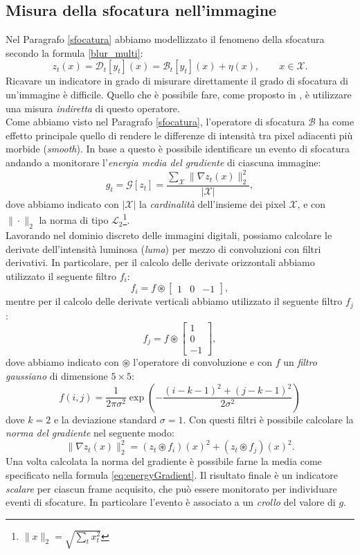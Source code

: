 \subsection{Misura della sfocatura nell'immagine}
Nel Paragrafo \ref{sfocatura} abbiamo modellizzato il fenomeno della sfocatura secondo la formula \eqref{blur_multi}:
\[z_t(x)=\mathcal{D}_t[y_t](x) = \mathcal{B}_t[y_t](x) + \eta(x), \qquad x \in \mathcal{X}.\]
Ricavare un indicatore in grado di misurare direttamente il grado di sfocatura di un'immagine \`e difficile.
Quello che \`e possibile fare, come proposto in \cite{alippi2010detecting}, \`e utilizzare una misura \textit{indiretta} di questo operatore.\\
Come abbiamo visto nel Paragrafo \ref{sfocatura}, l'operatore di sfocatura $\mathcal{B}$ ha come effetto principale quello di rendere le differenze di intensit\`a tra pixel adiacenti pi\`u morbide (\textit{smooth}).
In base a questo \`e possibile identificare un evento di sfocatura andando a monitorare l'\textit{energia media del gradiente} di ciascuna immagine:
\begin{equation}
\label{eq:energyGradient}
g_t = \mathcal{G}[z_t] =\frac{\sum_{\mathcal{X}}\| \nabla z_t(x) \| _2^2 }{|\mathcal{X}|} ,
\end{equation}  
dove abbiamo indicato con $|\mathcal{X}|$ la \textit{cardinalit\`a} dell'insieme dei pixel $\mathcal{X}$, e con $\|\cdot\|_2$ la norma di tipo $\mathcal{L}_2$\footnote{$\|x\|_2=\sqrt{\sum_{t}x_t^2}$}.\\
Lavorando nel dominio discreto delle immagini digitali, possiamo calcolare le derivate dell'intensit\`a luminosa (\textit{luma}) per mezzo di convoluzioni con filtri derivativi.
In particolare, per il calcolo delle derivate orizzontali  abbiamo utilizzato il seguente filtro $f_i$:
\[f_i = f \circledast \left[ \begin{array}{rcl}
1 & 0 & -1
\end{array}\right], \] 
mentre per il calcolo delle derivate verticali  abbiamo utilizzato il seguente filtro $f_j$:
\[f_j = f \circledast \left[ \begin{array}{r}
1 \\ 0 \\ -1
\end{array}\right], \]
dove abbiamo indicato con $\circledast$ l'operatore di convoluzione e con $f$ un \textit{filtro gaussiano} di dimensione $5 \times 5$:
\[f(i,j)=\frac{1}{2\pi\sigma^2}\exp\left(-\frac{\left(i-k-1\right)^2+\left(j-k-1\right)^2}{2\sigma^2}\right)\] 
dove $k=2$ e  la deviazione standard $\sigma = 1$.
Con questi filtri \`e possibile calcolare la \textit{norma del gradiente} nel seguente modo:
\[\| \nabla z_t(x) \|_2^2=\left(z_t \circledast f_i\right)(x)^2 + \left(z_t \circledast f_j\right)(x)^2.\]
Una volta calcolata la norma del gradiente \`e possibile farne la media come specificato nella formula \eqref{eq:energyGradient}.
Il risultato finale \`e un indicatore \textit{scalare} per ciascun frame acquisito, che pu\`o essere monitorato per individuare eventi di sfocature. 
In particolare l'evento \`e associato a un \textit{crollo} del valore di $g$.
